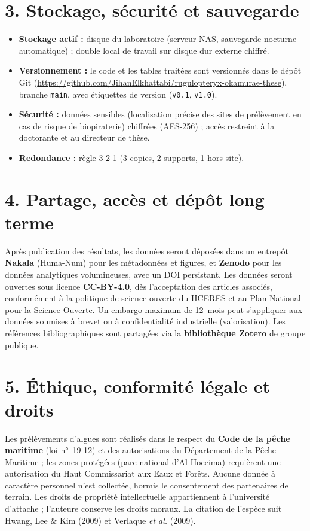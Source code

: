 \documentclass[11pt,a4paper]{article}
\begin{document}
\section*{3. Stockage, sécurité et sauvegarde}
\begin{itemize}
  \item \textbf{Stockage actif :} disque du laboratoire (serveur NAS, sauvegarde
        nocturne automatique) ; double local de travail sur disque dur externe chiffré.
  \item \textbf{Versionnement :} le code et les tables traitées sont versionnés dans
        le dépôt Git (\url{https://github.com/JihanElkhattabi/rugulopteryx-okamurae-these}),
        branche \texttt{main}, avec étiquettes de version (\texttt{v0.1}, \texttt{v1.0}).
  \item \textbf{Sécurité :} données sensibles (localisation précise des sites de
        prélèvement en cas de risque de biopiraterie) chiffrées (AES-256) ; accès
        restreint à la doctorante et au directeur de thèse.
  \item \textbf{Redondance :} règle 3-2-1 (3 copies, 2 supports, 1 hors site).
\end{itemize}

\section*{4. Partage, accès et dépôt long terme}
Après publication des résultats, les données seront déposées dans un entrepôt
\textbf{Nakala} (Huma-Num) pour les métadonnées et figures, et \textbf{Zenodo}
pour les données analytiques volumineuses, avec un DOI persistant. Les données
seront ouvertes sous licence \textbf{CC-BY-4.0}, dès l'acceptation des articles
associés, conformément à la politique de science ouverte du HCERES et au Plan
National pour la Science Ouverte. Un embargo maximum de 12~mois peut s'appliquer
aux données soumises à brevet ou à confidentialité industrielle (valorisation).
Les références bibliographiques sont partagées via la \textbf{bibliothèque Zotero}
de groupe publique.

\section*{5. Éthique, conformité légale et droits}
Les prélèvements d'algues sont réalisés dans le respect du \textbf{Code de la pêche
maritime} (loi n°~19-12) et des autorisations du Département de la Pêche Maritime ;
les zones protégées (parc national d'Al Hoceima) requièrent une autorisation du Haut
Commissariat aux Eaux et Forêts. Aucune donnée à caractère personnel n'est collectée,
hormis le consentement des partenaires de terrain. Les droits de propriété
intellectuelle appartiennent à l'université d'attache ; l'auteure conserve les droits
moraux. La citation de l'espèce suit Hwang, Lee \& Kim (2009) et Verlaque \textit{et al.} (2009).
\end{document}
